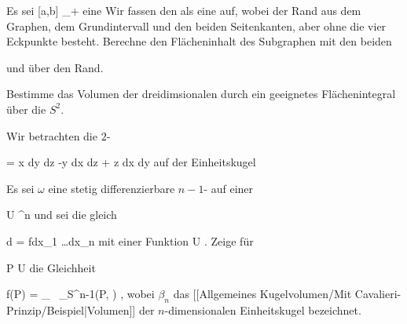 {}
{

Es sei
 { [a,b] } { \R_{+}
} {}
eine
Wir fassen den
als eine
auf, wobei der Rand aus dem Graphen, dem Grundintervall und den beiden Seitenkanten, aber ohne die vier Eckpunkte besteht. Berechne den Flächeninhalt des Subgraphen mit den beiden

 und
 über den Rand.

}
{} {}

{}
{

Bestimme das Volumen der dreidimsionalen
durch ein geeignetes Flächenintegral über die
$S^2$.

}
{} {}

{}
{

Wir betrachten die
$2$-

\mavergleichskettedisp
{\vergleichskette
{ \omega
}
{ =} { x dy \wedge dz -y dx \wedge dz + z dx \wedge dy
}
{ } {
}
{ } {
}
{ } {
}
}
{}{}{}
auf der Einheitskugel

}
{} {}

{}
{

Es sei $\omega$ eine stetig differenzierbare
$n-1$-
auf einer

\mavergleichskette
{\vergleichskette
{ U
}
{ \subseteq }{ \R^n
}
{  }{
}
{    }{
}
{   }{
}
}
{}{}{}
und sei die
gleich

\mavergleichskettedisp
{\vergleichskette
{d \omega
}
{ =} { fdx_1 \wedge \ldots \wedge dx_n
}
{ } {
}
{ } {
}
{ } {
}
}
{}{}{}
mit einer Funktion
 { U } {\R
} {.}
Zeige für

\mavergleichskette
{\vergleichskette
{ P
}
{ \in }{ U
}
{  }{
}
{    }{
}
{   }{
}
}
{}{}{}
die Gleichheit

\mavergleichskettedisp
{\vergleichskette
{ f(P)
}
{ =} { {  } \cdot {}_{   \epsilon {}  } \, {  } \int_{S^{n-1}(P, \epsilon)} \omega
}
{ } {
}
{ } {
}
{ } {
}
}
{}{}{,}
wobei $\beta_n$ das
[[Allgemeines Kugelvolumen/Mit Cavalieri-Prinzip/Beispiel|Volumen]]
der $n$-dimensionalen Einheitskugel bezeichnet.

}
{} {}


